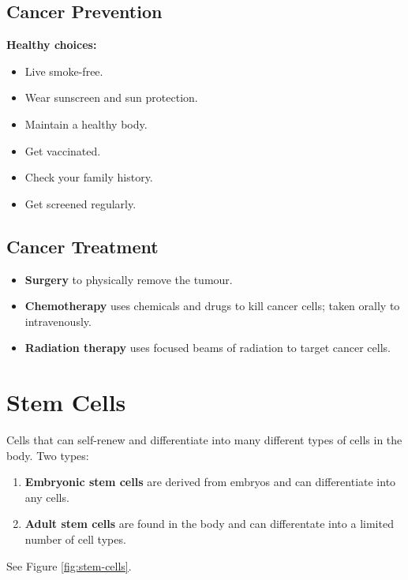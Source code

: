 \documentclass[12pt]{report}
\begin{document}
\newpage
\subsection{Cancer Prevention}
\textbf{Healthy choices:}
\begin{itemize}
    \item{Live smoke-free.}
    \item{Wear sunscreen and sun protection.}
    \item{Maintain a healthy body.}
    \item{Get vaccinated.}
    \item{Check your family history.}
    \item{Get screened regularly.}
\end{itemize}

\subsection{Cancer Treatment}
\begin{itemize}
    \item{ \textbf{Surgery} to physically remove the tumour.}
    \item{ \textbf{Chemotherapy} uses chemicals and drugs to kill cancer cells; taken orally to intravenously.}
    \item{ \textbf{Radiation therapy} uses focused beams of radiation to target cancer cells.}
\end{itemize}



\section{Stem Cells}
\begin{definition}
    Cells that can self-renew and differentiate into many different types of cells in the body. Two types: 
    \begin{enumerate}
    \setlength\itemsep{0.5em}
        \item{\textbf{Embryonic stem cells} are derived from embryos and can differentiate into any cells.}
        \item{\textbf{Adult stem cells} are found in the body and can differentate into a limited number of cell types.}
    \end{enumerate}
    See Figure \ref{fig:stem-cells}.
\end{definition}
\end{document}
